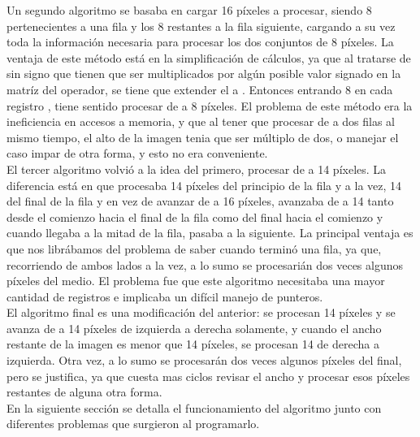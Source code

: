 Un segundo algoritmo se basaba en cargar 16 p\'ixeles a procesar,
siendo 8 pertenecientes a una fila y los 8 restantes a la fila siguiente, cargando a su vez toda la informaci\'on necesaria para procesar los dos conjuntos de 8 p\'ixeles. La ventaja de este m\'etodo est\'a en la simplificaci\'on de c\'alculos, ya que al tratarse de  sin signo que tienen que ser multiplicados por alg\'un posible valor signado en la matr\'iz del operador, se tiene que extender el  a . Entonces entrando 8  en cada registro , tiene sentido procesar de a 8 p\'ixeles.
El problema de este m\'etodo era la ineficiencia en accesos a memoria, y que al tener que procesar de a dos filas al mismo tiempo, el alto de la imagen tenia que ser m\'ultiplo de dos, o manejar el caso impar de otra forma, y esto no era conveniente. \\

El tercer algoritmo volvi\'o a la idea del primero, procesar de a 14 p\'ixeles. La diferencia est\'a en que procesaba 14 p\'ixeles del principio de la fila y a la vez, 14 del final de la fila y en vez de avanzar de a 16 p\'ixeles, avanzaba de a 14 tanto desde el comienzo hacia el final de la fila como del final hacia el comienzo y cuando llegaba a la mitad de la fila, pasaba a la siguiente.
La principal ventaja es que nos libr\'abamos del problema de saber cuando termin\'o una fila, ya que, recorriendo de ambos lados a la vez, a lo sumo se procesari\'an dos veces algunos p\'ixeles del medio. El problema fue que este algoritmo necesitaba una mayor cantidad de registros e implicaba un dif\'icil manejo de punteros. \\

El algoritmo final es una modificaci\'on del anterior: se procesan 14 p\'ixeles y se avanza de a 14 p\'ixeles de izquierda a derecha solamente, y cuando el ancho restante de la imagen es menor que 14 p\'ixeles, se procesan 14 de derecha a izquierda. Otra vez, a lo sumo se procesar\'an dos veces algunos p\'ixeles del final, pero se justifica, ya que cuesta mas ciclos revisar el ancho y procesar esos p\'ixeles restantes de alguna otra forma. \\

En la siguiente secci\'on se detalla el funcionamiento del algoritmo junto con diferentes problemas que surgieron al programarlo. \\

\pagebreak

